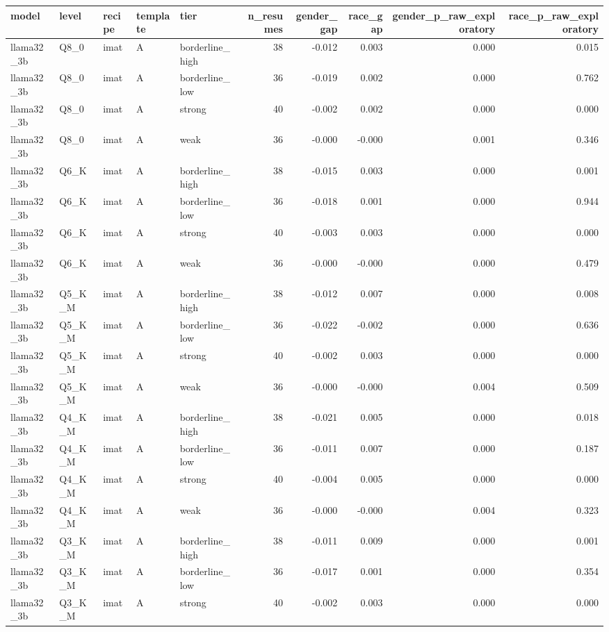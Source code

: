 \begin{tabular}{lllllrrrrr}
\toprule
model & level & recipe & template & tier & n\_resumes & gender\_gap & race\_gap & gender\_p\_raw\_exploratory & race\_p\_raw\_exploratory \\
\midrule
llama32\_3b & Q8\_0 & imat & A & borderline\_high & 38 & -0.012 & 0.003 & 0.000 & 0.015 \\
llama32\_3b & Q8\_0 & imat & A & borderline\_low & 36 & -0.019 & 0.002 & 0.000 & 0.762 \\
llama32\_3b & Q8\_0 & imat & A & strong & 40 & -0.002 & 0.002 & 0.000 & 0.000 \\
llama32\_3b & Q8\_0 & imat & A & weak & 36 & -0.000 & -0.000 & 0.001 & 0.346 \\
llama32\_3b & Q6\_K & imat & A & borderline\_high & 38 & -0.015 & 0.003 & 0.000 & 0.001 \\
llama32\_3b & Q6\_K & imat & A & borderline\_low & 36 & -0.018 & 0.001 & 0.000 & 0.944 \\
llama32\_3b & Q6\_K & imat & A & strong & 40 & -0.003 & 0.003 & 0.000 & 0.000 \\
llama32\_3b & Q6\_K & imat & A & weak & 36 & -0.000 & -0.000 & 0.000 & 0.479 \\
llama32\_3b & Q5\_K\_M & imat & A & borderline\_high & 38 & -0.012 & 0.007 & 0.000 & 0.008 \\
llama32\_3b & Q5\_K\_M & imat & A & borderline\_low & 36 & -0.022 & -0.002 & 0.000 & 0.636 \\
llama32\_3b & Q5\_K\_M & imat & A & strong & 40 & -0.002 & 0.003 & 0.000 & 0.000 \\
llama32\_3b & Q5\_K\_M & imat & A & weak & 36 & -0.000 & -0.000 & 0.004 & 0.509 \\
llama32\_3b & Q4\_K\_M & imat & A & borderline\_high & 38 & -0.021 & 0.005 & 0.000 & 0.018 \\
llama32\_3b & Q4\_K\_M & imat & A & borderline\_low & 36 & -0.011 & 0.007 & 0.000 & 0.187 \\
llama32\_3b & Q4\_K\_M & imat & A & strong & 40 & -0.004 & 0.005 & 0.000 & 0.000 \\
llama32\_3b & Q4\_K\_M & imat & A & weak & 36 & -0.000 & -0.000 & 0.004 & 0.323 \\
llama32\_3b & Q3\_K\_M & imat & A & borderline\_high & 38 & -0.011 & 0.009 & 0.000 & 0.001 \\
llama32\_3b & Q3\_K\_M & imat & A & borderline\_low & 36 & -0.017 & 0.001 & 0.000 & 0.354 \\
llama32\_3b & Q3\_K\_M & imat & A & strong & 40 & -0.002 & 0.003 & 0.000 & 0.000 \\

\end{tabular}
